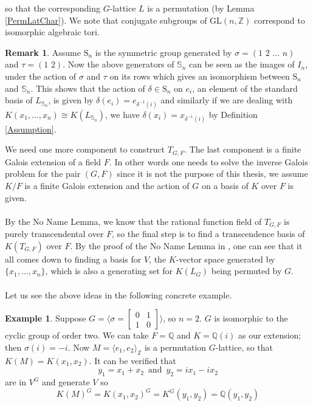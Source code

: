 \documentclass{article}
\theoremstyle{plain}
\theoremstyle{definition}
\newtheorem{example}[theorem]{Example}
\newtheorem*{remark}{Remark}
\newcommand{\Z}{\ensuremath{\mathbb{Z}}}
\newcommand{\Q}{\ensuremath{\mathbb{Q}}}
\begin{document}
so that the corresponding $G$-lattice $L$ is a permutation (by Lemma \ref{PermLatChar}).  We note that conjugate subgroups of $\mathrm{GL}(n, \Z)$ correspond to isomorphic algebraic tori.
\begin{remark}\label{ActionSn}
Assume $\mathrm{S}_n$ is the symmetric group generated by $\sigma = (1 \,\, 2 \,\, \ldots \,\, n)$ and $\tau = (1 \,\, 2)$. Now the above generators of $\mathbb{S}_n$ can be seen as the images of $I_n$, under the action of $\sigma$ and $\tau$ on its rows which gives an isomorphism between $\mathrm{S}_n$ and $\mathbb{S}_n$. This shows that the action of $\delta \in \mathrm{S}_n$ on $e_i$, an element of the standard basis of $L_{\mathbb{S}_n}$, is given by $\delta(e_i) = e_{\delta^{-1}(i)}$ and similarly if we are dealing with $K(x_1, \ldots , x_n ) \cong K(L_{\mathbb{S}_n})$, we have $\delta(x_i) = x_{\delta^{-1}(i)}$ by Definition \ref{Assumption}.
\end{remark}
\noindent
We need one more component to construct $T_{G,F}$. The last component is a finite Galois extension of a field $F$. In other words one needs to solve the inverse Galois problem for the pair $(G, F)$ since it is not the purpose of this thesis, we assume $K/F$ is a finite Galois extension and the action of $G$ on a basis of $K$ over $F$ is given.\\
\\By the No Name Lemma, we know that the rational function field of $T_{G,F}$ is purely transcendental over $F$, so the final step is to find a transcendence basis of $K(T_{G,F})$ over $F$. By the proof of the No Name Lemma in \cite{Lenstra}, one can see that it all comes down to finding a basis for $V$, the $K$-vector space generated by $\lbrace x_1, \ldots, x_n \rbrace$, which is also a generating set for $K(L_G)$ being permuted by $G$.\\
\\Let us see the above ideas in the following concrete example.
\begin{example}	
Suppose $G = \langle \sigma = \begin{bmatrix}
0&1\\
1&0
\end{bmatrix}\rangle$, so $n = 2$. $G$ is isomorphic to the cyclic group of order two. We can take $F = \Q$ and $K = \Q(i)$ as our extension; then $\sigma(i) = -i$. Now $M = \langle e_1, e_2 \rangle_{\Z}$ is a permutation $G$-lattice, so that $K(M) = K(x_1,x_2)$. It can be verified that $$y_1 = x_1+x_2\,\,\,  \textrm{and}\,\,\, y_2 = ix_1 -ix_2 $$ are in $V^G$ and generate $V$ so $$K(M)^G = K(x_1,x_2)^G = K^G(y_1,y_2) = \Q(y_1,y_2)$$
\end{example}
\end{document}
